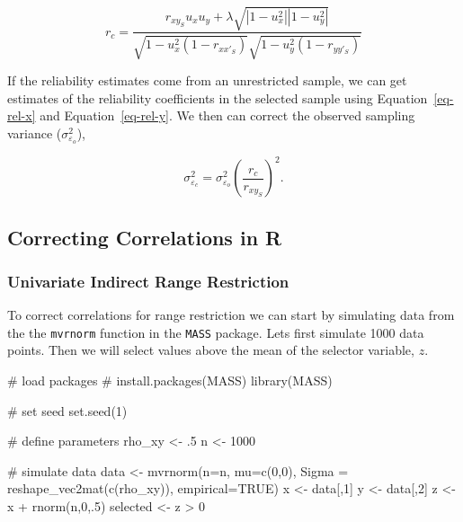 \documentclass[
  letterpaper,
  DIV=11,
  numbers=noendperiod]{scrreprt}
\newenvironment{Shaded}{\begin{snugshade}}{\end{snugshade}}
\newcommand{\AttributeTok}[1]{\textcolor[rgb]{0.40,0.45,0.13}{#1}}
\newcommand{\CommentTok}[1]{\textcolor[rgb]{0.37,0.37,0.37}{#1}}
\newcommand{\ConstantTok}[1]{\textcolor[rgb]{0.56,0.35,0.01}{#1}}
\newcommand{\DecValTok}[1]{\textcolor[rgb]{0.68,0.00,0.00}{#1}}
\newcommand{\FunctionTok}[1]{\textcolor[rgb]{0.28,0.35,0.67}{#1}}
\newcommand{\NormalTok}[1]{\textcolor[rgb]{0.00,0.23,0.31}{#1}}
\newcommand{\OtherTok}[1]{\textcolor[rgb]{0.00,0.23,0.31}{#1}}
\newcommand{\SpecialCharTok}[1]{\textcolor[rgb]{0.37,0.37,0.37}{#1}}
\begin{document}
\[
r_c = \frac{r_{xy_S}u_xu_y+\lambda\sqrt{|1-u_x^2||1-u_y^2|}}{\sqrt{1-u_x^2(1-r_{xx'_S})}\sqrt{1-u_y^2(1-r_{yy'_S})}}
\]

If the reliability estimates come from an unrestricted sample, we can
get estimates of the reliability coefficients in the selected sample
using Equation~\ref{eq-rel-x} and Equation~\ref{eq-rel-y}. We then can
correct the observed sampling variance (\(\sigma^2_{\varepsilon_o}\)),

\[
\sigma^2_{\varepsilon_c} = \sigma^2_{\varepsilon_o}\left(\frac{r_c}{r_{xy_S}}\right)^2.
\]

\hypertarget{correcting-correlations-in-r-3}{%
\subsection{Correcting Correlations in
R}\label{correcting-correlations-in-r-3}}

\hypertarget{univariate-indirect-range-restriction}{%
\subsubsection*{Univariate Indirect Range
Restriction}\label{univariate-indirect-range-restriction}}

To correct correlations for range restriction we can start by simulating
data from the the \texttt{mvrnorm} function in the \texttt{MASS}
package. Lets first simulate 1000 data points. Then we will select
values above the mean of the selector variable, \(z\).

\begin{Shaded}
\begin{Highlighting}[]
\CommentTok{\# load packages}
\CommentTok{\# install.packages(\textquotesingle{}MASS\textquotesingle{})}
\FunctionTok{library}\NormalTok{(MASS)}

\CommentTok{\# set seed}
\FunctionTok{set.seed}\NormalTok{(}\DecValTok{1}\NormalTok{)}

\CommentTok{\# define parameters}
\NormalTok{rho\_xy }\OtherTok{\textless{}{-}}\NormalTok{ .}\DecValTok{5}
\NormalTok{n }\OtherTok{\textless{}{-}} \DecValTok{1000}

\CommentTok{\# simulate data}
\NormalTok{data }\OtherTok{\textless{}{-}} \FunctionTok{mvrnorm}\NormalTok{(}\AttributeTok{n=}\NormalTok{n,}
                \AttributeTok{mu=}\FunctionTok{c}\NormalTok{(}\DecValTok{0}\NormalTok{,}\DecValTok{0}\NormalTok{),}
                \AttributeTok{Sigma =} \FunctionTok{reshape\_vec2mat}\NormalTok{(}\FunctionTok{c}\NormalTok{(rho\_xy)),}
                \AttributeTok{empirical=}\ConstantTok{TRUE}\NormalTok{)}
\NormalTok{x }\OtherTok{\textless{}{-}}\NormalTok{ data[,}\DecValTok{1}\NormalTok{]}
\NormalTok{y }\OtherTok{\textless{}{-}}\NormalTok{ data[,}\DecValTok{2}\NormalTok{]}
\NormalTok{z }\OtherTok{\textless{}{-}}\NormalTok{ x }\SpecialCharTok{+} \FunctionTok{rnorm}\NormalTok{(n,}\DecValTok{0}\NormalTok{,.}\DecValTok{5}\NormalTok{)}
\NormalTok{selected }\OtherTok{\textless{}{-}}\NormalTok{ z }\SpecialCharTok{\textgreater{}} \DecValTok{0}
\end{Highlighting}
\end{Shaded}
\end{document}

